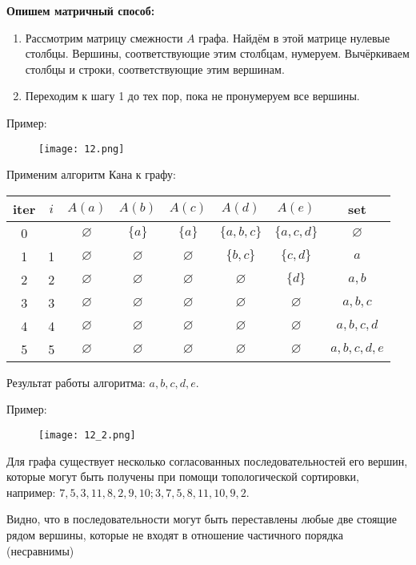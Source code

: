 \textbf{Опишем матричный способ:}

\begin{enumerate}[left=0.0em, labelsep=1em, topsep=0.0em, itemsep=0pt, parsep=0.5em]
    \item Рассмотрим матрицу смежности $A$ графа. Найдём в этой матрице
    нулевые столбцы. Вершины, соответствующие этим столбцам, нумеруем.
    Вычёркиваем столбцы и строки, соответствующие этим вершинам.
    \item Переходим к шагу 1 до тех пор, пока не пронумеруем все вершины.
\end{enumerate}

Пример:
\begin{figure}[h]
    \centering
    \texttt{[image: 12.png]}
\end{figure}

\newpage
Применим алгоритм Кана к графу:
\begin{table}[h!]
    \centering
    \begin{tabular}{|c|c|c|c|c|c|c|c|}
        \hline
        iter & $i$ & $A(a)$ & $A(b)$ & $A(c)$ & $A(d)$ & $A(e)$ & set \\
        \hline
        0 &  & $\varnothing$ & $\{a\}$ & $\{a\}$ & $\{a,b,c\}$ & $\{a,c,d\}$ & $\varnothing$ \\
        \hline
        1 & 1 & $\varnothing$ & $\varnothing$ & $\varnothing$ & $\{b,c\}$ & $\{c,d\}$ & $a$ \\
        \hline
        2 & 2 & $\varnothing$ & $\varnothing$ & $\varnothing$ & $\varnothing$ & $\{d\}$ & $a,b$ \\
        \hline
        3 & 3 & $\varnothing$ & $\varnothing$ & $\varnothing$ & $\varnothing$ & $\varnothing$ & $a,b,c$ \\
        \hline
        4 & 4 & $\varnothing$ & $\varnothing$ & $\varnothing$ & $\varnothing$ & $\varnothing$ & $a,b,c,d$ \\
        \hline
        5 & 5 & $\varnothing$ & $\varnothing$ & $\varnothing$ & $\varnothing$ & $\varnothing$ & $a,b,c,d,e$ \\
        \hline
    \end{tabular}
\end{table}

Результат работы алгоритма: $a, b, c, d, e$.

Пример:
\begin{figure}[h]
    \centering
    \texttt{[image: 12\_2.png]}
\end{figure}

Для графа существует несколько согласованных последовательностей его
вершин, которые могут быть получены при помощи топологической
сортировки, например: $7,5,3,11,8,2,9,10; 3,7,5,8,11,10,9,2$.

Видно, что в последовательности могут быть переставлены любые две
стоящие рядом вершины, которые не входят в отношение частичного
порядка (несравнимы)